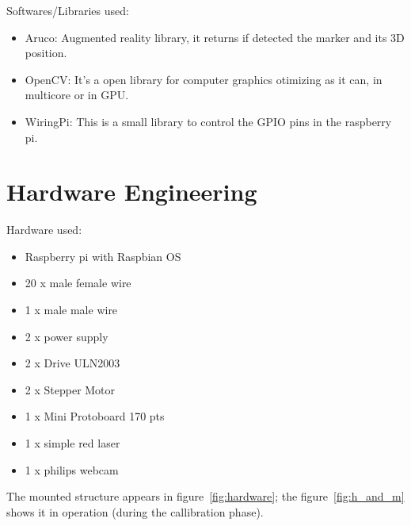 \documentclass{article}
\begin{document}
Softwares/Libraries used:
\begin{itemize}
    \item Aruco: Augmented reality library, it returns if detected the marker
and its 3D position.
    \item OpenCV: It's a open library for computer graphics otimizing as it can,
in multicore or in GPU. 
    \item WiringPi: This is a small library to control the GPIO pins in the
raspberry pi.
\end{itemize}

\section{Hardware Engineering}

Hardware used:
\begin{itemize}
    \item Raspberry pi with Raspbian OS
    \item 20 x male female wire
    \item 1 x male male wire
    \item 2 x power supply
    \item 2 x Drive ULN2003
    \item 2 x Stepper Motor
    \item 1 x Mini Protoboard 170 pts
    \item 1 x simple red laser
    \item 1 x philips webcam
\end{itemize}

The mounted structure appears in figure~\ref{fig:hardware};
the figure~\ref{fig:h_and_m} shows it in operation
(during the callibration phase).
\end{document}

